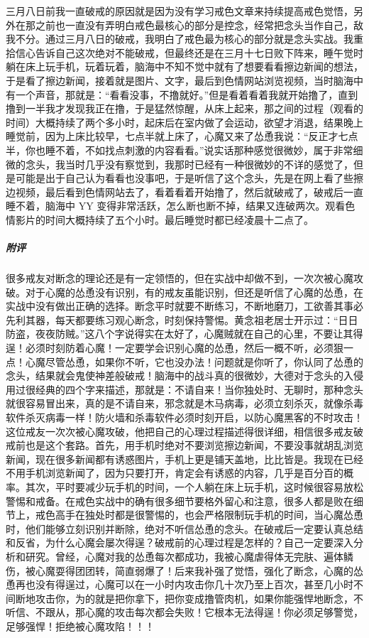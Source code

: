\begin{case}
    三月八日前我一直破戒的原因就是因为没有学习戒色文章来持续提高戒色觉悟，另外在那之前也一直没有弄明白戒色最核心的部分是控念，经常把念头当作自己，敌我不分。通过三月八日的破戒，我明白了戒色最为核心的部分就是念头实战。我重拾信心告诉自己这次绝对不能破戒，但最终还是在三月十七日败下阵来，睡午觉时躺在床上玩手机，玩着玩着，脑海中不知不觉中就有了想要看看擦边新闻的想法，于是看了擦边新闻，接着就是图片、文字，最后到色情网站浏览视频，当时脑海中有一个声音，那就是：“看看没事，不撸就好。”但是看着看着我就开始撸了，直到撸到一半我才发现我正在撸，于是猛然惊醒，从床上起来，那之间的过程（观看的时间）大概持续了两个多小时，起床后在室内做了会运动，欲望才消退，结果晚上睡觉前，因为上床比较早，七点半就上床了，心魔又来了怂恿我说：“反正才七点半，你也睡不着，不如找点刺激的内容看看。”说实话那种感觉很微妙，属于非常细微的念头，我当时几乎没有察觉到，我那时已经有一种很微妙的不详的感觉了，但是可能是出于自己认为看看也没事吧，于是听信了这个念头，先是在网上看了些擦边视频，最后看到色情网站去了，看着看着开始撸了，然后就破戒了，破戒后一直睡不着，脑海中 YY 变得非常活跃，怎么断也断不掉，结果又连破两次。观看色情影片的时间大概持续了五个小时。最后睡觉时都已经凌晨十二点了。
    \subparagraph{附评} 很多戒友对断念的理论还是有一定领悟的，但在实战中却做不到，一次次被心魔攻破。对于心魔的怂恿没有识别，有的戒友虽能识别，但还是听信了心魔的怂恿，在实战中没有做出正确的选择。断念平时就要不断练习，不断地磨刀，工欲善其事必先利其器，每天都要练习观心断念，时刻保持警惕。黄念祖老居士开示过：“日日防盗，夜夜防贼。”这八个字说得实在太好了，心魔贼就在自己的心里，不要让其得逞！必须时刻防着心魔！一定要学会识别心魔的怂恿，然后一概不听，必须狠一点！心魔尽管怂恿，如果你不听，它也没办法！问题就是你听了，你认同了怂恿的念头，结果就会鬼使神差般破戒！脑海中的战斗真的很微妙，大德对于念头的入侵用过很经典的四个字来描述，那就是：不请自来！当你独处时、无聊时，那种念头就很容易冒出来，真的是不请自来，邪念就是木马病毒，必须立刻杀灭，就像杀毒软件杀灭病毒一样！防火墙和杀毒软件必须时刻开启，以防心魔黑客的不时攻击！这位戒友一次次被心魔攻破，他把自己的心理过程描述得很详细，相信很多戒友破戒前也是这个套路。首先，用手机时绝对不要浏览擦边新闻，不要没事就胡乱浏览新闻，现在很多新闻都有诱惑图片，手机上更是铺天盖地，比比皆是。我现在已经不用手机浏览新闻了，因为只要打开，肯定会有诱惑的内容，几乎是百分百的概率。其次，平时要减少玩手机的时间，一个人躺在床上玩手机，这时候很容易放松警惕和戒备。在戒色实战中的确有很多细节要格外留心和注意，很多人都是败在细节上，戒色高手在独处时都是很警惕的，也会严格限制玩手机的时间，当心魔怂恿时，他们能够立刻识别并断除，绝对不听信怂恿的念头。在破戒后一定要认真总结和反省，为什么心魔会屡次得逞？破戒前的心理过程是怎样的？自己一定要深入分析和研究。曾经，心魔对我的怂恿每次都成功，我被心魔虐得体无完肤、遍体鳞伤，被心魔耍得团团转，简直弱爆了！后来我补强了觉悟，强化了断念，心魔的怂恿再也没有得逞过，心魔可以在一小时内攻击你几十次乃至上百次，甚至几小时不间断地攻击你，为的就是把你拿下，把你变成撸管肉机，如果你能强悍地断念，不听信、不跟从，那心魔的攻击每次都会失败！它根本无法得逞！你必须足够警觉，足够强悍！拒绝被心魔攻陷！！！
\end{case}

